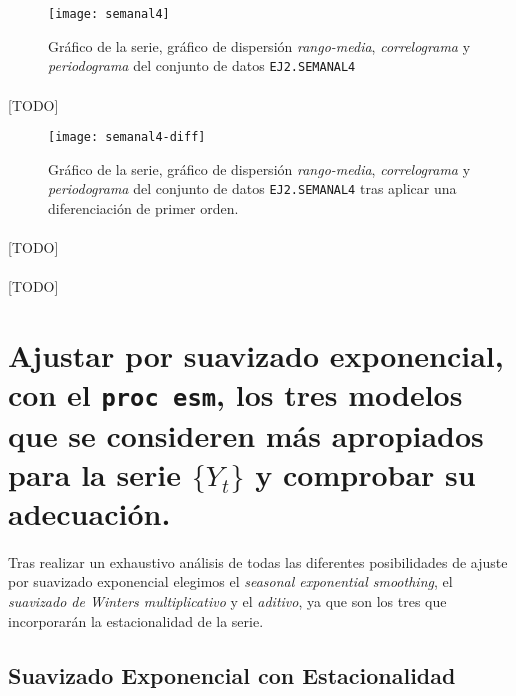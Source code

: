 \documentclass[a4paper, spanish]{article}
\begin{document}
      \begin{figure}[htb!]
        \centering
        \texttt{[image: semanal4]}
        \caption{Gráfico de la serie, gráfico de dispersión \emph{rango-media}, \emph{correlograma} y \emph{periodograma} del conjunto de datos \texttt{EJ2.SEMANAL4}}
        \label{img:semanal4}
      \end{figure}

      \paragraph{}
      [TODO]

      \begin{figure}[htb!]
        \centering
        \texttt{[image: semanal4-diff]}
        \caption{Gráfico de la serie, gráfico de dispersión \emph{rango-media}, \emph{correlograma} y \emph{periodograma} del conjunto de datos \texttt{EJ2.SEMANAL4} tras aplicar una diferenciación de primer orden.}
        \label{img:semanal4_diff}
      \end{figure}

      \paragraph{}
      [TODO]

    \paragraph{}
    [TODO]

  \section{Ajustar por suavizado exponencial, con el \texttt{proc esm}, los tres modelos que se consideren más apropiados para la serie $\{Y_t\}$ y comprobar su adecuación.}
  \label{sec:b}

    \paragraph{}
    Tras realizar un exhaustivo análisis de todas las diferentes posibilidades de ajuste por suavizado exponencial elegimos el \textit{seasonal exponential smoothing}, el \textit{suavizado de Winters multiplicativo} y el \textit{aditivo}, ya que son los tres que incorporarán la estacionalidad de la serie.

    \subsection{Suavizado Exponencial con Estacionalidad}
\end{document}
